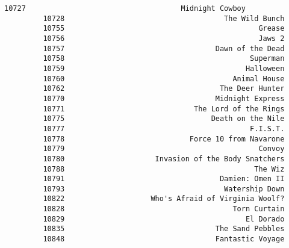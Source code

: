 \documentclass[11pt]{article}
\begin{document}
\begin{Verbatim}[commandchars=\\\{\}]
         10727                                    Midnight Cowboy   
         10728                                     The Wild Bunch   
         10755                                             Grease   
         10756                                             Jaws 2   
         10757                                   Dawn of the Dead   
         10758                                           Superman   
         10759                                          Halloween   
         10760                                       Animal House   
         10762                                    The Deer Hunter   
         10770                                   Midnight Express   
         10771                              The Lord of the Rings   
         10775                                  Death on the Nile   
         10777                                           F.I.S.T.   
         10778                             Force 10 from Navarone   
         10779                                             Convoy   
         10780                     Invasion of the Body Snatchers   
         10788                                            The Wiz   
         10791                                    Damien: Omen II   
         10793                                     Watership Down   
         10822                    Who's Afraid of Virginia Woolf?   
         10828                                       Torn Curtain   
         10829                                          El Dorado   
         10835                                   The Sand Pebbles   
         10848                                   Fantastic Voyage   
         

\end{Verbatim}
\end{document}
